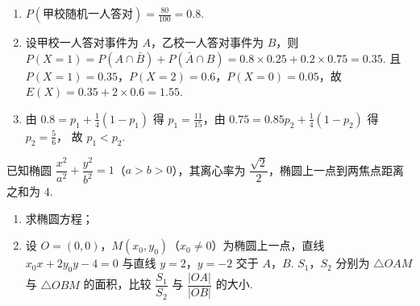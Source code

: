 \documentclass[UTF8,a4paper,oneside,11pt]{ctexbook}
\begin{document}
\begin{solution}
\begin{enumerate}
\item \(P(\text{甲校随机一人答对})=\frac{80}{100}=0.8\).

\item 设甲校一人答对事件为 \(A\)，乙校一人答对事件为 \(B\)，则
\(P(X=1)=P(A\cap\bar B)+P(\bar A\cap B)=0.8\times0.25+0.2\times0.75=0.35\).
且 \(P(X=1)=0.35\)，\(P(X=2)=0.6\)，\(P(X=0)=0.05\)，故 \(E(X)=0.35+2\times0.6=1.55\).

\item 由 \(0.8=p_1+\frac14(1-p_1)\) 得 \(p_1=\frac{11}{15}\)，由 \(0.75=0.85p_2+\frac14(1-p_2)\) 得 \(p_2=\frac56\)，
故 \(p_1<p_2\).
\end{enumerate}
\end{solution}

\begin{problem}
已知椭圆 \(\dfrac{x^2}{a^2}+\dfrac{y^2}{b^2}=1\)（\(a>b>0\)），其离心率为 \(\dfrac{\sqrt{2}}{2}\)，椭圆上一点到两焦点距离之和为 \(4\).

\begin{enumerate}
\item 求椭圆方程；
\item 设 \(O=(0,0)\)，\(M(x_0,y_0)\)（\(x_0\ne0\)）为椭圆上一点，直线 \(x_0x+2y_0y-4=0\) 与直线 \(y=2\)，\(y=-2\) 交于 \(A\)，\(B\). \(S_1\)，\(S_2\) 分别为 \(\triangle OAM\) 与 \(\triangle OBM\) 的面积，比较 \(\dfrac{S_1}{S_2}\) 与 \(\dfrac{|OA|}{|OB|}\) 的大小.
\end{enumerate}
\end{problem}
\end{document}
